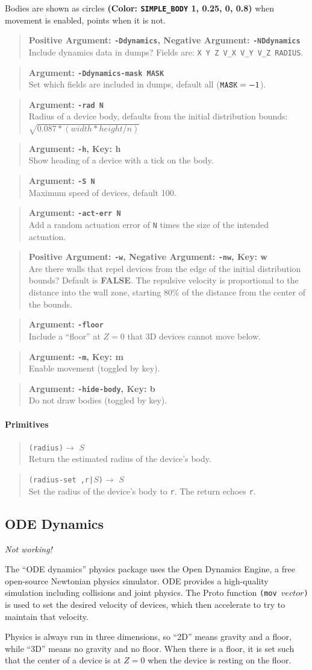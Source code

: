 \documentclass{article}
\newcommand\broken{{\em Not working!}}
\newcommand\false{{\bf FALSE}}
\newcommand\var[1]{{\tt #1}}
\newcommand\key[1]{{\bf #1}}
\newcommand\simarg[2]{\begin{quote} {\bf Argument: \var{#1}} \\ #2 \end{quote}}
\newcommand\simargkey[3]{
  \begin{quote} {\bf Argument: \var{#1}, Key: \key{#2}} \\ #3 \end{quote}
}
\newcommand\simPMarg[3]{
  \begin{quote}
    {\bf Positive Argument: \var{#1}, Negative Argument: \var{#2}} \\ #3
  \end{quote}
}
\newcommand\simPMargkey[4]{
  \begin{quote}
    {\bf Positive Argument: \var{#1}, Negative Argument: \var{#2}, 
      Key: \key{#3}} \\ #4
  \end{quote}
}
\newcommand\color[5]{{\bf (Color: {\tt #1} #2, #3, #4, #5)}} %
\newcommand\function[3]
{\begin{quote}{\tt #1}$\rightarrow$ \type{#2} \\ #3 \end{quote}}
\newcommand\type[1]{$#1$}
\begin{document}
Bodies are shown as circles \color{SIMPLE\_BODY}{1}{0.25}{0}{0.8} when
movement is enabled, points when it is not.

\simPMarg{-Ddynamics}{-NDdynamics}{Include dynamics data in dumps?
  Fields are: \var{X Y Z V\_X V\_Y V\_Z RADIUS}.}
\simarg{-Ddynamics-mask MASK}{Set which fields are included in 
  dumps, default all ($\var{MASK}=-1$).}

\simarg{-rad N}{Radius of a device body, defaults from the initial
  distribution bounds: $\sqrt{0.087*(width*height/n)}$}
\simargkey{-h}{h}{Show heading of a device with a tick on the body.}
\simarg{-S N}{Maximum speed of devices, default 100.}
\simarg{-act-err N}{Add a random actuation error of \var{N} times the
  size of the intended actuation.}
\simPMargkey{-w}{-nw}{w}{Are there walls that repel devices from the
  edge of the initial distribution bounds?  Default is \false{}. The
  repulsive velocity is proportional to the distance into the wall
  zone, starting 80\% of the distance from the center of the bounds.}
\simarg{-floor}{Include a ``floor'' at $Z=0$ that 3D devices cannot
  move below.}
\simargkey{-m}{m}{Enable movement (toggled by key).}
\simargkey{-hide-body}{b}{Do not draw bodies (toggled by key).}

\paragraph{Primitives}

\function{(radius)}{S}{Return the estimated radius of the device's body.}
\function{(radius-set ,r|\type{S})}{S}{Set the radius of the device's
  body to \var{r}.  The return echoes \var{r}.}

\subsection{ODE Dynamics}

\broken{}

The ``ODE dynamics'' physics package uses the Open Dynamics
Engine\cite{ode}, a free open-source Newtonian physics simulator.  ODE
provides a high-quality simulation including collisions and joint
physics.  The Proto function \var{(mov $vector$)} is used to set the
desired velocity of devices, which then accelerate to try to maintain
that velocity.

Physics is always run in three dimensions, so ``2D'' means gravity and
a floor, while ``3D'' means no gravity and no floor.  When there is a
floor, it is set such that the center of a device is at $Z=0$ when the
device is resting on the floor.
\end{document}
